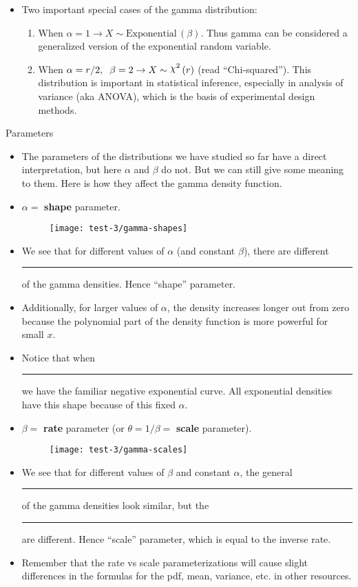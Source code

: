 \documentclass{article}
\newcommand{\blankul}[1]{\rule[-1.5mm]{#1}{0.15mm}}	%
\newcommand{\follow}[1]{\sim \text{#1}\,}		%
\newcommand{\chisq}{\raisebox{2pt}{$\chi^2$}}		%
\begin{document}
\begin{itemize}
\begin{itemize}
        \item Two important special cases of the gamma distribution:
        \begin{enumerate}
            \item When $\alpha = 1 \rightarrow X \follow{Exponential}(\beta)$. Thus gamma can be considered a generalized version of the exponential random variable.\vspace{40pt}
            \item When $\alpha = r / 2, \;\; \beta = 2 \rightarrow X \follow{\chisq}(r)$ (read ``Chi-squared''). This distribution is important in statistical inference, especially in analysis of variance (aka ANOVA), which is the basis of experimental design methods.
        \end{enumerate}
    \end{itemize}
\end{itemize}\bigskip

Parameters\bigskip
\begin{itemize}
    \item The parameters of the distributions we have studied so far have a direct interpretation, but here $\alpha$ and $\beta$ do not. But we can still give some meaning to them. Here is how they affect the gamma density function.
    \item $\alpha = $ \textbf{shape} parameter.
    \begin{figure}[H]
        \center\texttt{[image: test-3/gamma-shapes]}
    \end{figure}
    \item[] We see that for different values of $\alpha$ (and constant $\beta$), there are different \blankul{1.5cm} of the gamma densities. Hence ``shape'' parameter.
    \item[] Additionally, for larger values of $\alpha$, the density increases longer out from zero because the polynomial part of the density function is more powerful for small $x$. 
    \item[] Notice that when \blankul{1cm} we have the familiar negative exponential curve. All exponential densities have this shape because of this fixed $\alpha$.
    
    \newpage
    
    \item $\beta = $ \textbf{rate} parameter (or $\theta = 1 / \beta = $ \textbf{scale} parameter).
    \begin{figure}[H]
        \center\texttt{[image: test-3/gamma-scales]}
    \end{figure}
    \item[] We see that for different values of $\beta$ and constant $\alpha$, the general \blankul{1.5cm} of the gamma densities look similar, but the \blankul{1.5cm} are different. Hence ``scale'' parameter, which is equal to the inverse rate.
    \item Remember that the rate vs scale parameterizations will cause slight differences in the formulas for the pdf, mean, variance, etc. in other resources.
\end{itemize}\bigskip
\end{document}
